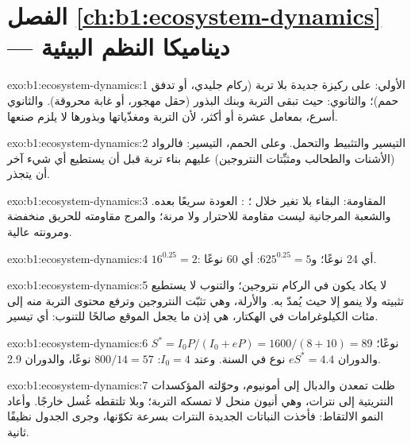 \section*{الفصل \ref{ch:b1:ecosystem-dynamics} --- ديناميكا النظم البيئية}

\begin{solution}{exo:b1:ecosystem-dynamics:1}
الأولي: على ركيزة جديدة بلا تربة (ركام جليدي، أو تدفق حمم)؛
والثانوي: حيث تبقى التربة وبنك البذور (حقل مهجور، أو
غابة محروقة). والثانوي أسرع، بمعامل عشرة أو أكثر، لأن
التربة ومغذّياتها وبذورها لا يلزم صنعها.
\end{solution}

\begin{solution}{exo:b1:ecosystem-dynamics:2}
التيسير والتثبيط والتحمل. وعلى الحمم، التيسير:
فالرواد (الأشنات والطحالب ومثبِّتات النتروجين) عليهم بناء تربة قبل
أن يستطيع أي شيء آخر أن يتجذر.
\end{solution}

\begin{solution}{exo:b1:ecosystem-dynamics:3}
المقاومة: البقاء بلا تغير خلال ؛ :
العودة سريعًا بعده. والشعبة المرجانية ليست مقاومة للاحترار
ولا مرنة؛ والمرج مقاومته للحريق منخفضة ومرونته
عالية.
\end{solution}

\begin{solution}{exo:b1:ecosystem-dynamics:4}
$16^{0.25} = 2$: أي \num{24} نوعًا؛ و$625^{0.25} = 5$: أي \num{60} نوعًا.
\end{solution}

\begin{solution}{exo:b1:ecosystem-dynamics:5}
لا يكاد يكون في الركام نتروجين؛ والتنوب لا يستطيع تثبيته ولا ينمو إلا
حيث يُمدّ به. والأرلة، وهي تثبّت النتروجين وترفع
محتوى التربة منه إلى مئات الكيلوغرامات في الهكتار، هي إذن
ما يجعل الموقع صالحًا للتنوب: أي تيسير.
\end{solution}

\begin{solution}{exo:b1:ecosystem-dynamics:6}
$S^* = I_0 P/(I_0 + eP) = 1600/(8 + 10) = 89$ نوعًا؛ والدوران
$eS^* = 4.4$ نوع في السنة. وعند $I_0 = 4$: $800/14 = 57$ نوعًا،
والدوران \num{2.9}.
\end{solution}

\begin{solution}{exo:b1:ecosystem-dynamics:7}
ظلت  تمعدن  والدبال إلى أمونيوم،
وحوّلته المؤكسدات النتريتية إلى نترات، وهي أنيون منحل لا
تمسكه التربة؛ وبلا  تلتقطه غُسل خارجًا. وأعاد النمو
الالتقاط: فأخذت النباتات الجديدة النترات بسرعة
تكوّنها، وجرى الجدول نظيفًا ثانية.
\end{solution}

